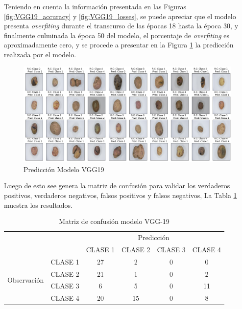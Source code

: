 Teniendo en cuenta la información presentada en las Figuras \ref{fig:VGG19_accuracy} y \ref{fig:VGG19_losses}, se puede apreciar que el modelo presenta \textit{overfiting} durante el transcurso de las épocas 18 hasta la época 30, y finalmente culminada la época 50 del modelo, el porcentaje de \textit{overfiting} es aproximadamente cero, y se procede a presentar en la Figura \ref*{fig:VGG19_prediccion} la predicción realizada por el modelo.

\begin{figure}[ht]
	\centering
	\includegraphics[scale=0.4]{Figs/103.png}
	\caption{Predicción Modelo VGG19}
	\label{fig:VGG19_prediccion}
\end{figure}

\newpage
Luego de esto see genera la matriz de confusión para validar los verdaderos positivos, verdaderos negativos, falsos positivos y falsos negativos, La Tabla \ref{fig:MC_VGG19} muestra los resultados.


\begin{table}[htbp]
	\centering
	\begin{tabular}{|c|l|c|c|c|c|}
		\hline
		\multicolumn{2}{|c|}{\multirow{2}[4]{*}{}} & \multicolumn{4}{c|}{Predicción} \bigstrut\\
		\cline{3-6}    \multicolumn{2}{|c|}{} & CLASE 1 & CLASE 2 & CLASE 3 & CLASE 4 \bigstrut\\
		\hline
		\multirow{4}[8]{*}{\begin{sideways}Observación\end{sideways}} & CLASE 1 & 27     & 2     & 0    & 0 \bigstrut\\
		\cline{2-6}     & CLASE 2 & 21     & 1     & 0    & 2 \bigstrut\\
		\cline{2-6}      & CLASE 3 & 6     & 5     & 0    & 11 \bigstrut\\
		\cline{2-6}     & CLASE 4 & 20     & 15     & 0    & 8 \bigstrut\\
		\hline
	\end{tabular}%
	\caption{Matriz de confusión modelo VGG-19}
	\label{fig:MC_VGG19}
\end{table}%

